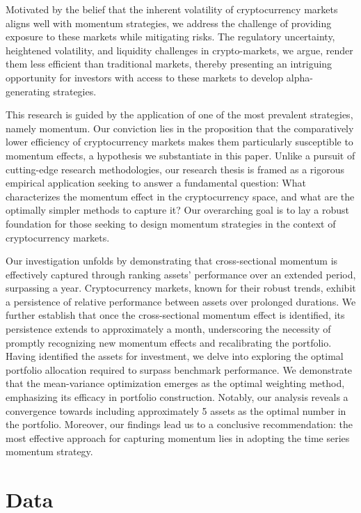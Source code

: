 \documentclass{article}
\begin{document}
Motivated by the belief that the inherent volatility of cryptocurrency markets aligns well with momentum strategies, we address the challenge of providing exposure to these markets while mitigating risks. The regulatory uncertainty, heightened volatility, and liquidity challenges in crypto-markets, we argue, render them less efficient than traditional markets, thereby presenting an intriguing opportunity for investors with access to these markets to develop alpha-generating strategies.

This research is guided by the application of one of the most prevalent strategies, namely momentum. Our conviction lies in the proposition that the comparatively lower efficiency of cryptocurrency markets makes them particularly susceptible to momentum effects, a hypothesis we substantiate in this paper. Unlike a pursuit of cutting-edge research methodologies, our research thesis is framed as a rigorous empirical application seeking to answer a fundamental question: What characterizes the momentum effect in the cryptocurrency space, and what are the optimally simpler methods to capture it? Our overarching goal is to lay a robust foundation for those seeking to design momentum strategies in the context of cryptocurrency markets.

Our investigation unfolds by demonstrating that cross-sectional momentum is effectively captured through ranking assets' performance over an extended period, surpassing a year. Cryptocurrency markets, known for their robust trends, exhibit a persistence of relative performance between assets over prolonged durations. We further establish that once the cross-sectional momentum effect is identified, its persistence extends to approximately a month, underscoring the necessity of promptly recognizing new momentum effects and recalibrating the portfolio. Having identified the assets for investment, we delve into exploring the optimal portfolio allocation required to surpass benchmark performance. We demonstrate that the mean-variance optimization emerges as the optimal weighting method, emphasizing its efficacy in portfolio construction. Notably, our analysis reveals a convergence towards including approximately 5 assets as the optimal number in the portfolio. Moreover, our findings lead us to a conclusive recommendation: the most effective approach for capturing momentum lies in adopting the time series momentum strategy.

\section{Data}\label{sec:data}
\end{document}
